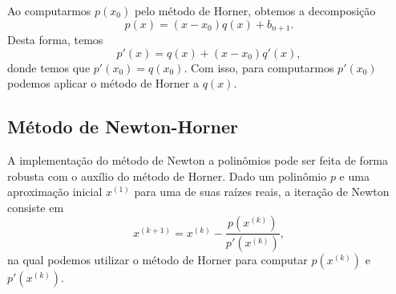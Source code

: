 \begin{obs}\label{obs:Horner_polider}
  Ao computarmos $p(x_0)$ pelo método de Horner, obtemos a decomposição
  \begin{equation}
    p(x) = (x-x_0)q(x) + b_{n+1}.
  \end{equation}
Desta forma, temos
\begin{equation}
  p'(x) = q(x) + (x-x_0)q'(x),
\end{equation}
donde temos que $p'(x_0) = q(x_0)$. Com isso, para computarmos $p'(x_0)$ podemos aplicar o método de Horner a $q(x)$.

% 
\end{obs}

\subsection{Método de Newton-Horner}

A implementação do método de Newton a polinômios pode ser feita de forma robusta com o auxílio do método de Horner. Dado um polinômio $p$ e uma aproximação inicial $x^{(1)}$ para uma de suas raízes reais, a iteração de Newton consiste em
\begin{equation}
  x^{(k+1)} = x^{(k)} - \frac{p(x^{(k)})}{p'(x^{(k)})},
\end{equation}
na qual podemos utilizar o método de Horner para computar $p(x^{(k)})$ e $p'(x^{(k)})$.

